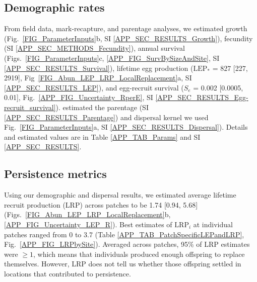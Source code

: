 \documentclass[12pt, oneside]{article}   	%
\begin{document}
\subsection*{Demographic rates}


From field data, mark-recapture, and parentage analyses, we estimated growth (Fig.\ \ref{FIG_ParameterInputs}b, SI \ref{APP_SEC_RESULTS_Growth}), fecundity (SI \ref{APP_SEC_METHODS_Fecundity}), annual survival (Figs.\ \ref{FIG_ParameterInputs}c, \ref{APP_FIG_SurvBySizeAndSite}, SI \ref{APP_SEC_RESULTS_Survival}), lifetime egg production ($\text{LEP}_*$ = 827 [227, 2919], Fig\ \ref{FIG_Abun_LEP_LRP_LocalReplacement}a, SI \ref{APP_SEC_RESULTS_LEP}), and egg-recruit survival ($S_e$ =  0.002 [0.0005, 0.01], Fig.\ \ref{APP_FIG_Uncertainty_RperE}, SI \ref{APP_SEC_RESULTS_Egg-recruit_survival}). \cite{catalanoInPrepconnectivity} estimated the parentage (SI \ref{APP_SEC_RESULTS_Parentage}) and dispersal kernel we used Fig.\ \ref{FIG_ParameterInputs}a, SI \ref{APP_SEC_RESULTS_Dispersal}). Details and estimated values are in Table \ref{APP_TAB_Params} and SI \ref{APP_SEC_RESULTS}.

\subsection*{Persistence metrics}

Using our demographic and dispersal results, we estimated average lifetime recruit production (LRP) across patches to be 1.74 [0.94, 5.68] (Figs.\ \ref{FIG_Abun_LEP_LRP_LocalReplacement}b, \ref{APP_FIG_Uncertainty_LEP_R}). Best estimates of $\text{LRP}_i$ at individual patches ranged from 0 to 3.7 (Table \ref{APP_TAB_PatchSpecificLEPandLRP}, Fig.\ \ref{APP_FIG_LRPbySite}). Averaged across patches, 95\% of LRP estimates were $\geq 1$, which means that individuals produced enough offspring to replace themselves. However, LRP does not tell us whether those offspring settled in locations that contributed to persistence.
\end{document}
